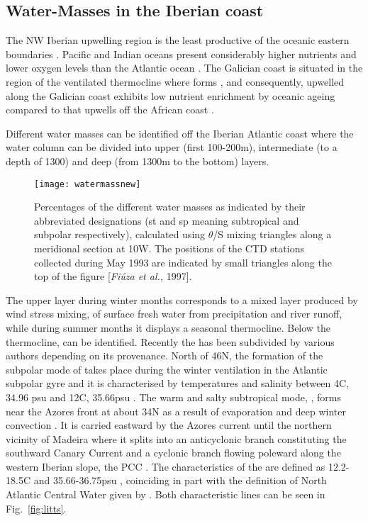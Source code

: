 \subsection{Water-Masses in the Iberian coast }
The NW Iberian upwelling region is the least productive  of the
oceanic eastern boundaries \citep{Castro00}. Pacific and Indian
oceans present considerably higher nutrients and lower oxygen
levels than the Atlantic ocean \citep{Levitus93}. The Galician
coast is situated in the region of the ventilated thermocline
where \enaw forms \citep{Rios92}, and consequently, \enaw upwelled
along the Galician coast exhibits low nutrient enrichment by
oceanic ageing compared to \enaw that upwells off the African
coast \citep{Castro00}.

Different water masses can be identified off the Iberian Atlantic
coast where the water column can be divided into upper (first
100-200m), intermediate (to a depth of 1300) and deep (from 1300m
to the bottom) layers.
\begin{figure}
  \centering
  \texttt{[image: watermassnew]}
  \caption{Percentages of the different water masses as indicated
  by their abbreviated designations (st and sp meaning subtropical
  and subpolar respectively), calculated using $\theta$/S mixing
  triangles along a meridional section at 10\deg W. The positions of
  the CTD stations collected during May 1993 are indicated by
  small triangles along the top of the figure [{\it Fi\'uza et
  al.,} 1997].}
  \label{fig:ctdmixing}
\end{figure}

The upper layer during winter months corresponds to a mixed layer
produced by wind stress mixing, of surface fresh water from
precipitation and river runoff, while during summer months it
displays a seasonal thermocline. Below the thermocline, \enaw can
be identified. Recently the \enaw has been subdivided by various
authors depending on its provenance. North of 46\deg N, the
formation of the subpolar mode of \enawp takes place during the
winter ventilation in the Atlantic subpolar gyre and it is
characterised by temperatures and salinity between 4\deg C, 34.96
psu and 12\deg C, 35.66psu \citep{Rios92}. The warm and salty
subtropical mode, \enawt, forms near the Azores front at about
34\deg N as a result of evaporation and deep winter convection
\citep{Fiuza84}. It is carried eastward by the Azores current
until the northern vicinity of Madeira where it splits into an
anticyclonic branch constituting the southward Canary Current and
a cyclonic branch flowing poleward along the western Iberian
slope, the PCC \citep{Fiuza97}. The characteristics of the \enawt
are defined as 12.2-18.5\deg C and 35.66-36.75psu
\citep{Fiuza82a,Rios92}, coinciding in part with the definition of
North Atlantic Central Water given by \citet{Helland-Hunsen26}.
Both characteristic lines can be seen in Fig.~\ref{fig:litts}.

